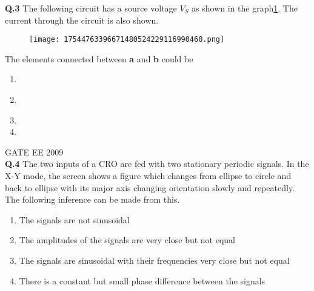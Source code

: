 \documentclass[12pt]{article}
\begin{document}
\noindent
\textbf{Q.3} The following circuit has a source voltage $V_S$ as shown in the graph\ref{fig:1}. The current through the circuit is also shown. \\


\begin{figure}[h!]
    \centering
    \texttt{[image: 17544763396671480524229116990460.png]}
\label{fig:1}
\end{figure}
The elements connected between \textbf{a} and \textbf{b} could be \\
 \begin{enumerate}
     \item  {}
\hspace{5pt}
\item  {}
\hspace{5pt} \\
\item  {}
\hspace{5pt}
\item {}
 \end{enumerate}
 \hspace{10pt}
GATE EE 2009 \\
\textbf{Q.4} The two inputs of a CRO are fed with two stationary periodic signals. In the X-Y mode, the screen shows a figure which changes from ellipse to circle and back to ellipse with its major axis changing orientation slowly and repeatedly. The following inference can be made from this. 
\begin{enumerate}
    \item  The signals are not sinusoidal 
\item  The amplitudes of the signals are very close but not equal 
\item  The signals are sinusoidal with their frequencies very close but not equal 
\item There is a constant but small phase difference between the signals
\end{enumerate}
\end{document}
